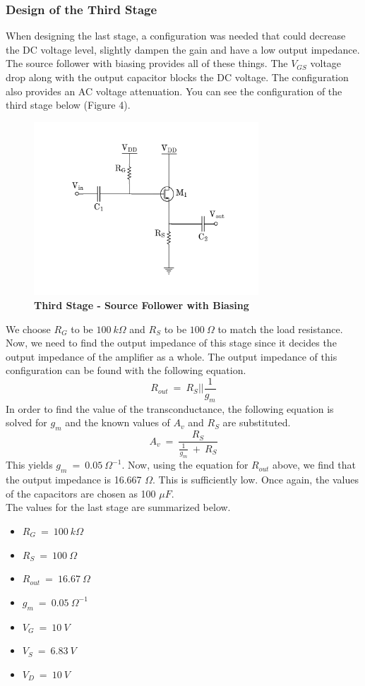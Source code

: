 \documentclass{article}
\begin{document}
    \subsubsection{Design of the Third Stage}
    When designing the last stage, a configuration was needed that could decrease the DC voltage level, slightly dampen the gain and have a low output impedance. The source follower with biasing provides all of these things. The $V_{GS}$ voltage drop along with the output capacitor blocks the DC voltage. The configuration also provides an AC voltage attenuation. You can see the configuration of the third stage below (Figure 4). 
    \begin{figure}[H]
        \caption{\textbf{Third Stage - Source Follower with Biasing}}
    	\centerline{\includegraphics[width=0.75\textwidth]{third_stage}}
    \end{figure}
We choose $R_G$ to be $100\ k\Omega$ and $R_S$ to be $100\ \Omega$ to match the load resistance. Now, we need to find the output impedance of this stage since it decides the output impedance of the amplifier as a whole. The output impedance of this configuration can be found with the following equation.
$$ R_{out}\ =\ R_S||\frac{1}{g_m} $$
In order to find the value of the transconductance, the following equation is solved for $g_m$ and the known values of $A_v$ and $R_S$ are substituted.
$$ A_v\ =\ \frac{R_S}{\frac{1}{g_m}\ +\ R_S}$$ 
This yields $g_m\ =\ 0.05\ \Omega^{-1}$. Now, using the equation for $R_{out}$ above, we find that the output impedance is 16.667 $\Omega$. This is sufficiently low. 
Once again, the values of the capacitors are chosen as 100 $\mu F$.    \\
\noindent The values for the last stage are summarized below.
    \begin{itemize}
    \item $R_{G}\ =\ 100\ k\Omega$ 
    \item $R_{S}\ =\ 100\ \Omega$
    \item $R_{out}\ =\ 16.67\ \Omega$
    \item $g_m\ =\ 0.05\ \Omega^{-1}$
    \item $V_G\ =\ 10\ V$
    \item $V_S\ =\ 6.83\ V$
    \item $V_D\ =\ 10\ V$
    \end{itemize}
\end{document}
